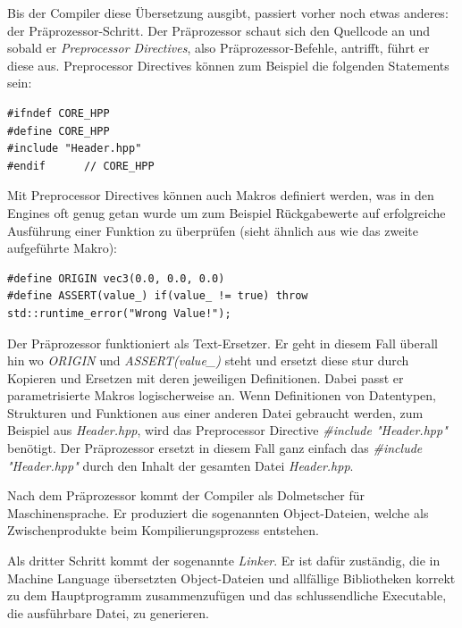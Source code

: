 \documentclass[titlepage, 11pt, a4paper, ngerman]{article}
\begin{document}
Bis der \gls{Compiler} diese Übersetzung ausgibt, passiert vorher noch etwas anderes: der Präprozessor-Schritt. Der Präprozessor schaut sich den Quellcode an und sobald er \textit{Preprocessor Directives}, also Präprozessor-Befehle, antrifft, führt er diese aus. Preprocessor Directives können zum Beispiel die folgenden Statements sein:
\begin{verbatim}
#ifndef CORE_HPP 
#define CORE_HPP 
#include "Header.hpp"
#endif      // CORE_HPP
\end{verbatim}
\bigbreak
Mit Preprocessor Directives können auch Makros definiert werden, was in den Engines oft genug getan wurde um zum Beispiel Rückgabewerte auf erfolgreiche Ausführung einer Funktion zu überprüfen (sieht ähnlich aus wie das zweite aufgeführte Makro):
\begin{verbatim}
#define ORIGIN vec3(0.0, 0.0, 0.0)
#define ASSERT(value_) if(value_ != true) throw std::runtime_error("Wrong Value!");
\end{verbatim}
\bigbreak
Der Präprozessor funktioniert als Text-Ersetzer. Er geht in diesem Fall überall hin wo \textit{ORIGIN} und \textit{ASSERT(value\_)} steht und ersetzt diese stur durch Kopieren und Ersetzen mit deren jeweiligen Definitionen. Dabei passt er parametrisierte Makros logischerweise an. Wenn Definitionen von Datentypen, Strukturen und Funktionen aus einer anderen Datei gebraucht werden, zum Beispiel aus \textit{Header.hpp}, wird das Preprocessor Directive \textit{\#include "Header.hpp"} benötigt. Der Präprozessor ersetzt in diesem Fall ganz einfach das \textit{\#include "Header.hpp"} durch den Inhalt der gesamten Datei \textit{Header.hpp}.\par
Nach dem Präprozessor kommt der \gls{Compiler} als Dolmetscher für Maschinensprache. Er produziert die sogenannten Object-Dateien, welche als Zwischenprodukte beim Kompilierungsprozess entstehen.\par
Als dritter Schritt kommt der sogenannte \textit{\gls{Linker}}. Er ist dafür zuständig, die in Machine Language übersetzten Object-Dateien und allfällige Bibliotheken korrekt zu dem Hauptprogramm zusammenzufügen und das schlussendliche Executable, die ausführbare Datei, zu generieren.
\end{document}
